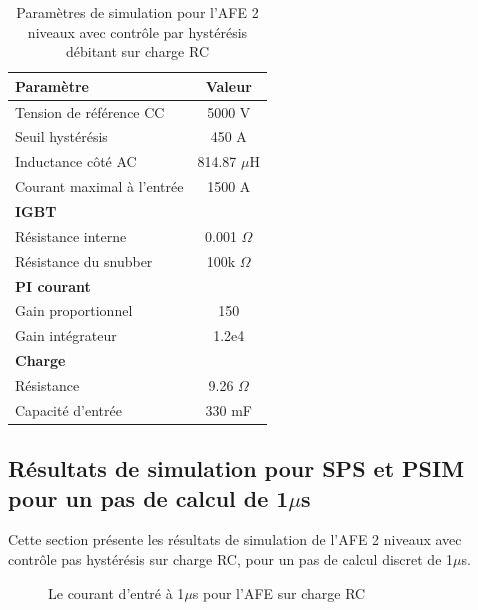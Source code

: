 \begin{table}[htb]
\centering
\begin{tabular}{|l|c|} 
  \hline
  \textbf{Paramètre} & \textbf{Valeur}  \\
  \hline\hline
  Tension de référence CC & 5000 V\\ \hline
  Seuil hystérésis & 450 A\\ \hline
  Inductance côté AC& 814.87 $\mu$H\\ \hline
  Courant maximal à l'entrée& 1500 A \\ \hline \hline
  \multicolumn{2}{|l|}{\textbf{IGBT}}\\ \hline
  Résistance interne & 0.001 $\Omega$\\
  Résistance du snubber & 100k $\Omega$\\ \hline \hline
   \multicolumn{2}{|l|}{\textbf{PI courant}}\\ \hline
  Gain proportionnel & 150 \\
  Gain intégrateur & 1.2e4 \\ \hline \hline
  \multicolumn{2}{|l|}{\textbf{Charge}}\\ \hline
  Résistance & 9.26 $\Omega$ \\
  Capacité d'entrée & 330 mF\\
  \hline
\end{tabular}
\caption{Paramètres de simulation pour l'AFE 2 niveaux avec contrôle par hystérésis débitant sur charge RC}
\label{p_AF_RC}
\end{table}

\clearpage

\subsection{Résultats de simulation pour SPS et PSIM pour un pas de calcul de 1$\mu$s}
Cette section présente les résultats de simulation de l'AFE 2 niveaux avec contrôle pas hystérésis sur charge RC, pour un pas de calcul discret de 1$\mu$s. 




\begin{figure}[htb]
\caption{Le courant d'entré à 1$\mu$s pour l'AFE sur charge RC}
\label{AF_RC_cou}
\end{figure}





